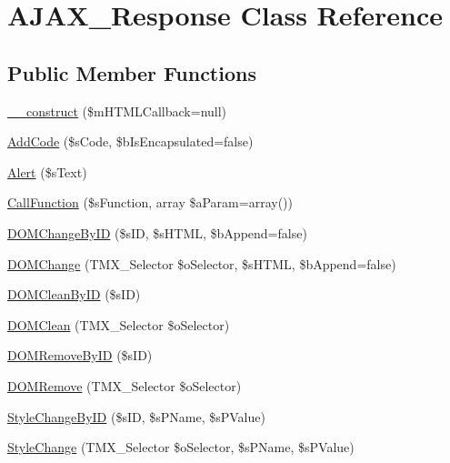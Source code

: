 \hypertarget{class_a_j_a_x___response}{\section{A\-J\-A\-X\-\_\-\-Response Class Reference}
\label{class_a_j_a_x___response}
}
\subsection*{Public Member Functions}
\begin{DoxyCompactItemize}
\item 
\hyperlink{class_a_j_a_x___response_ad375f00a3cb840edc05a9bd76a018306}{\-\_\-\-\_\-construct} (\$m\-H\-T\-M\-L\-Callback=null)
\item 
\hyperlink{class_a_j_a_x___response_aaf1fce395bcbe3abf2b468900269b847}{Add\-Code} (\$s\-Code, \$b\-Is\-Encapsulated=false)
\item 
\hyperlink{class_a_j_a_x___response_a88ef970898b2eaa6f1e00cc2f8ab525d}{Alert} (\$s\-Text)
\item 
\hyperlink{class_a_j_a_x___response_acd8296b7efd8f5a68f9a01b55b743b78}{Call\-Function} (\$s\-Function, array \$a\-Param=array())
\item 
\hyperlink{class_a_j_a_x___response_add7ea7d572b0d9dc1667e1647c3afbf6}{D\-O\-M\-Change\-By\-I\-D} (\$s\-I\-D, \$s\-H\-T\-M\-L, \$b\-Append=false)
\item 
\hyperlink{class_a_j_a_x___response_a07eaac9c29789b66c057e91000fb6154}{D\-O\-M\-Change} (T\-M\-X\-\_\-\-Selector \$o\-Selector, \$s\-H\-T\-M\-L, \$b\-Append=false)
\item 
\hyperlink{class_a_j_a_x___response_a1fa313b00bf5d79b31995f6ba7e5118a}{D\-O\-M\-Clean\-By\-I\-D} (\$s\-I\-D)
\item 
\hyperlink{class_a_j_a_x___response_a4e50a8d73c499058854b6ef469487a2f}{D\-O\-M\-Clean} (T\-M\-X\-\_\-\-Selector \$o\-Selector)
\item 
\hyperlink{class_a_j_a_x___response_a2f63ac10071f1df881cfd6832ff2d97e}{D\-O\-M\-Remove\-By\-I\-D} (\$s\-I\-D)
\item 
\hyperlink{class_a_j_a_x___response_ac23f48ef808f969afbc2f21204430584}{D\-O\-M\-Remove} (T\-M\-X\-\_\-\-Selector \$o\-Selector)
\item 
\hyperlink{class_a_j_a_x___response_aee268771716be54ef20ed7e5518745ca}{Style\-Change\-By\-I\-D} (\$s\-I\-D, \$s\-P\-Name, \$s\-P\-Value)
\item 
\hyperlink{class_a_j_a_x___response_a7a8236facfbbb8af103eef5b597e4bbe}{Style\-Change} (T\-M\-X\-\_\-\-Selector \$o\-Selector, \$s\-P\-Name, \$s\-P\-Value)

\end{DoxyCompactItemize}
